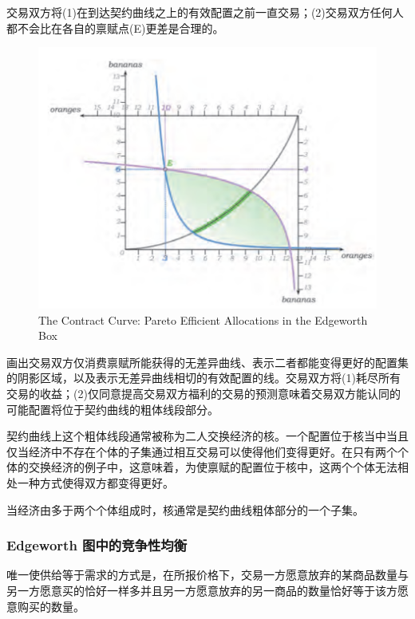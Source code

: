 \documentclass{article}
\begin{document}
交易双方将(1)在到达契约曲线之上的有效配置之前一直交易；(2)交易双方任何人都不会比在各自的禀赋点(E)更差是合理的。

\begin{figure}[H] %
	\centering %
	\includegraphics[width=1\textwidth]{16_2} %
	\caption{The Contract Curve: Pareto Efficient Allocations in the Edgeworth Box} %
	\label{Fig.main3} %
\end{figure}

画出交易双方仅消费禀赋所能获得的无差异曲线、表示二者都能变得更好的配置集的阴影区域，以及表示无差异曲线相切的有效配置的线。交易双方将(1)耗尽所有交易的收益；(2)仅同意提高交易双方福利的交易的预测意味着交易双方能认同的可能配置将位于契约曲线的粗体线段部分。

契约曲线上这个粗体线段通常被称为二人交换经济的核。一个配置位于核当中当且仅当经济中不存在个体的子集通过相互交易可以使得他们变得更好。在只有两个个体的交换经济的例子中，这意味着，为使禀赋的配置位于核中，这两个个体无法相处一种方式使得双方都变得更好。

当经济由多于两个个体组成时，核通常是契约曲线粗体部分的一个子集。

\subsubsection{Edgeworth 图中的竞争性均衡}

唯一使供给等于需求的方式是，在所报价格下，交易一方愿意放弃的某商品数量与另一方愿意买的恰好一样多并且另一方愿意放弃的另一商品的数量恰好等于该方愿意购买的数量。
\end{document}

